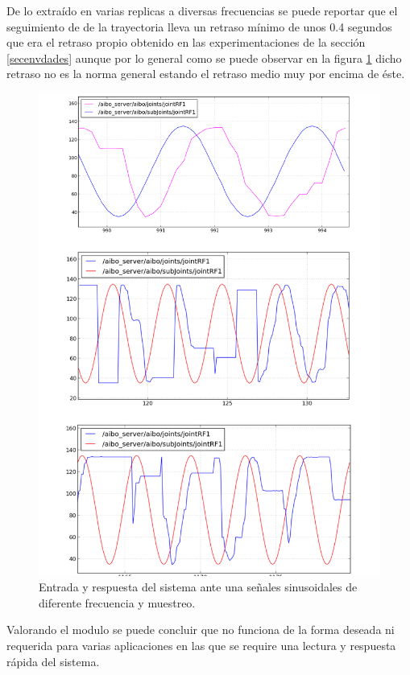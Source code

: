 \documentclass[12pt,a4paper,final,twoside]{article}
\begin{document}
De lo extraído en varias replicas a diversas frecuencias se puede reportar que el seguimiento de de la trayectoria lleva un retraso mínimo de unos 0.4 segundos que era el retraso propio obtenido en las experimentaciones de la sección \ref{secenvdades} aunque por lo general como se puede observar en la figura \ref{fig:ASsin} 
dicho retraso no es la norma general estando el retraso medio muy por encima de éste.
\begin{figure}[H]
	\centering
    \includegraphics[scale=0.7]{images/sinlegWR/sinusoides.pdf}
	 \caption{Entrada y respuesta del sistema ante una señales sinusoidales de diferente frecuencia y muestreo.}
  \label{fig:ASsin}
\end{figure}

Valorando el modulo se puede concluir que no funciona de la forma deseada ni requerida para varias aplicaciones en las que se require una lectura y respuesta rápida del sistema. 
\end{document}
